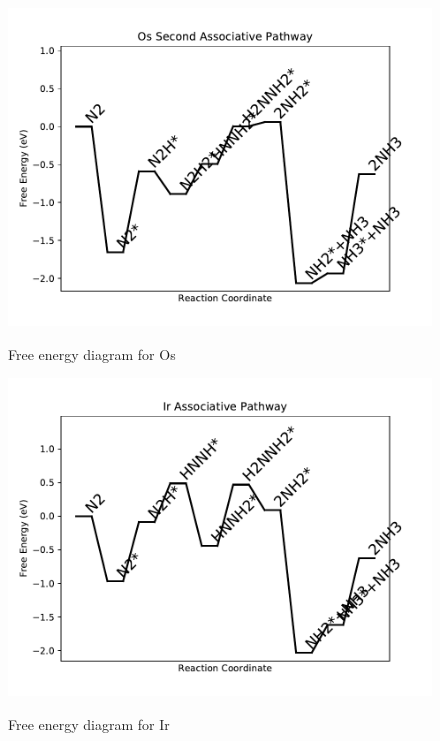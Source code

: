 \documentclass[journal=jacsat,manuscript=article]{achemso}
\begin{document}
\begin{figure}
\includegraphics[width=1\linewidth]{data/plots/Os_associative_2.pdf}
\label{fig:Os_associative_2}
\caption{Free energy diagram for Os}
\end{figure}

\newpage
\begin{figure}
\includegraphics[width=1\linewidth]{data/plots/Ir_associative.pdf}
\label{fig:Ir_associative}
\caption{Free energy diagram for Ir}
\end{figure}
\end{document}
